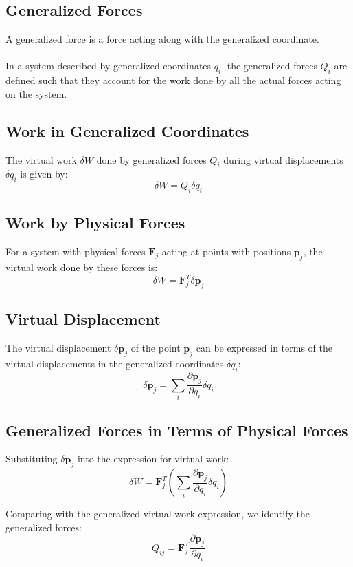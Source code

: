 \subsection{Generalized Forces}
A generalized force is a force acting along with the generalized coordinate.
\\
\\
In a system described by generalized coordinates $q_i$, the generalized forces $Q_i$ are defined such that they account for the work done by all the actual forces acting on the system.
\subsection{Work in Generalized Coordinates}
The virtual work \( \delta W \) done by generalized forces \( Q_i \) during virtual displacements \( \delta q_i \) is given by:
\[
\delta W =  Q_i \delta q_i
\]


\subsection{Work by Physical Forces}
For a system with physical forces \( \mathbf{F}_j \) acting at points with positions \( \mathbf{p}_j \), the virtual work done by these forces is:
\[
\delta W = \mathbf{F}_j^T \delta \mathbf{p}_j
\]


\subsection{Virtual Displacement}
The virtual displacement \( \delta \mathbf{p}_j \) of the point \( \mathbf{p}_j \) can be expressed in terms of the virtual displacements in the generalized coordinates \( \delta q_i \):
\[
\delta \mathbf{p}_j = \sum_{i} \frac{\partial \mathbf{p}_j}{\partial q_i} \delta q_i
\]

\subsection{Generalized Forces in Terms of Physical Forces}
Substituting \( \delta \mathbf{p}_j \) into the expression for virtual work:
\[
\delta W = \mathbf{F}_j^T \left( \sum_{i} \frac{\partial \mathbf{p}_j}{\partial q_i} \delta q_i \right)
\]

Comparing with the generalized virtual work expression, we identify the generalized forces:
\[
Q_{ij} = \mathbf{F}_j^T \frac{\partial \mathbf{p}_j}{\partial q_i}
\]
